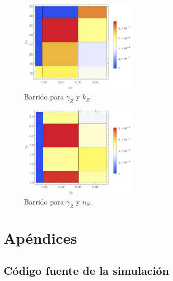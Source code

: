 \documentclass[12pt]{article}
\begin{document}
\begin{figure}[H]
  \centering
  \includegraphics[width=0.5\textwidth]{gammaZ-kZ.jpeg}
  \caption{\label{fig:gammaZ-kZ} Barrido para $\gamma_Z$ y $k_Z$.}
 \end{figure}

\begin{figure}[H]
  \centering
  \includegraphics[width=0.5\textwidth]{gammaZ-nS.jpeg}
  \caption{\label{fig:gammaZ-nS} Barrido para $\gamma_Z$ y $n_S$.}
 \end{figure}

\appendix
\section{Ap\'endices}
\subsection{C\'odigo fuente de la simulaci\'on}
\label{sec:code}



\end{document}

